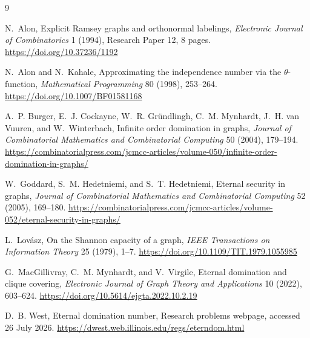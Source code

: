 \documentclass[11pt]{article}
\begin{document}
\clearpage
\begin{thebibliography}{9}

N.~Alon,
\newblock Explicit Ramsey graphs and orthonormal labelings,
\newblock \emph{Electronic Journal of Combinatorics} 1 (1994),
Research Paper 12, 8 pages.
\newblock \url{https://doi.org/10.37236/1192}

N.~Alon and N.~Kahale,
\newblock Approximating the independence number via the
\(\theta\)-function,
\newblock \emph{Mathematical Programming} 80 (1998), 253--264.
\newblock \url{https://doi.org/10.1007/BF01581168}

A.~P. Burger, E.~J. Cockayne, W.~R. Gr\"undlingh, C.~M. Mynhardt,
J.~H. van Vuuren, and W.~Winterbach,
\newblock Infinite order domination in graphs,
\newblock \emph{Journal of Combinatorial Mathematics and Combinatorial
Computing} 50 (2004), 179--194.
\newblock \url{https://combinatorialpress.com/jcmcc-articles/volume-050/infinite-order-domination-in-graphs/}

W.~Goddard, S.~M. Hedetniemi, and S.~T. Hedetniemi,
\newblock Eternal security in graphs,
\newblock \emph{Journal of Combinatorial Mathematics and Combinatorial
Computing} 52 (2005), 169--180.
\newblock \url{https://combinatorialpress.com/jcmcc-articles/volume-052/eternal-security-in-graphs/}

L.~Lov\'asz,
\newblock On the Shannon capacity of a graph,
\newblock \emph{IEEE Transactions on Information Theory} 25 (1979), 1--7.
\newblock \url{https://doi.org/10.1109/TIT.1979.1055985}

G.~MacGillivray, C.~M. Mynhardt, and V.~Virgile,
\newblock Eternal domination and clique covering,
\newblock \emph{Electronic Journal of Graph Theory and Applications}
10 (2022), 603--624.
\newblock \url{https://doi.org/10.5614/ejgta.2022.10.2.19}

D.~B. West,
\newblock Eternal domination number,
\newblock Research problems webpage, accessed 26 July 2026.
\newblock \url{https://dwest.web.illinois.edu/regs/eterndom.html}

\end{thebibliography}
\end{document}
